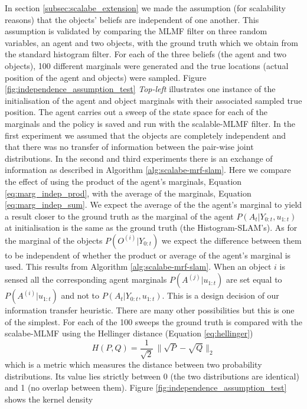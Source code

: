 \documentclass{frontiersSCNS} %
\begin{document}
In section \ref{subsec:scalabe_extension} we made the assumption (for scalability reasons) that the objects' beliefs are independent
of one another. This assumption is validated by comparing the MLMF filter on three random variables, an agent and two objects, with the ground truth
which we obtain from the standard histogram filter. For each of the three beliefs (the agent and two objects), 100 different marginals 
were generated and the true locations (actual position of the agent and objects) were sampled. 
Figure \ref{fig:independence_assumption_test} \textit{Top-left} illustrates one instance of the initialisation of the agent and object marginals
with their associated sampled true position.
The agent carries out  a sweep of the state space for each of the marginals and the policy is saved 
and run with the scalable-MLMF filter. In the first experiment we assumed that the objects are completely independent 
and that there was no transfer of information between the pair-wise joint distributions. In the second and third experiments there 
is an exchange of information as described in Algorithm \ref{alg:scalabe-mrf-slam}. Here we compare the effect of using 
the product of the agent's marginals, Equation \ref{eq:marg_indep_prod}, with the average of the marginals, Equation \ref{eq:marg_indep_sum}.
We expect the average of the the agent's marginal to yield a result closer to the ground truth as the marginal of the 
agent $P(A_t|Y_{0:t},u_{1:t})$ at initialisation is the same as the ground truth (the Histogram-SLAM's). As for the marginal of the 
objects $P(O^{(i)}|Y_{0:t})$ we expect the difference between them to be independent of whether the product or average of the 
agent's marginal is used. This results from Algorithm \ref{alg:scalabe-mrf-slam}. When an object $i$ is sensed all the corresponding 
agent marginals $P(A^{(j)}|u_{1:t})$ are set equal to $P(A^{(i)}|u_{1:t})$ and not to $P(A_t|Y_{0:t},u_{1:t})$. This is a design 
decision of our information transfer heuristic. There are many other possibilities but this is one of the simplest.
For each of the 100 sweeps the ground truth is compared with the scalabe-MLMF using the Hellinger distance (Equation \ref{eq:hellinger})
\begin{equation} \label{eq:hellinger}
 H(P,Q) = \frac{1}{\sqrt{2}}\, \|\sqrt{P} - \sqrt{Q}\|_2  
\end{equation}
which is a metric which measures the distance between two probability distributions. Its value lies strictly between 0 (the two 
distributions are identical) and 1 (no overlap between them). Figure \ref{fig:independence_assumption_test} shows the kernel density 
\end{document}
